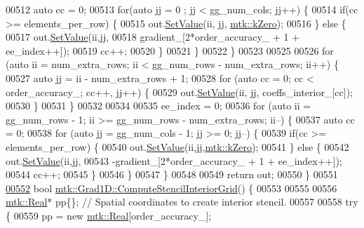 \begin{DoxyCode}
{{00512     \textcolor{keyword}{auto} cc = 0;
00513     \textcolor{keywordflow}{for}(\textcolor{keyword}{auto} jj = 0 ; jj < gg\_num\_cols; jj++) \{
00514       \textcolor{keywordflow}{if}(cc >= elements\_per\_row) \{
00515         out.\hyperlink{classmtk_1_1DenseMatrix_ae0f873a6d3a734da467cafb817da64ae}{SetValue}(ii, jj, \hyperlink{group__c01-roots_ga59a451a5fae30d59649bcda274fea271}{mtk::kZero});
00516       \} \textcolor{keywordflow}{else} \{
00517         out.\hyperlink{classmtk_1_1DenseMatrix_ae0f873a6d3a734da467cafb817da64ae}{SetValue}(ii,jj,
00518                      gradient\_[2*order\_accuracy\_ + 1 + ee\_index++]);
00519         cc++;
00520       \}
00521     \}
00522   \}
00523 
00525 
00526   \textcolor{keywordflow}{for} (\textcolor{keyword}{auto} ii = num\_extra\_rows; ii < gg\_num\_rows - num\_extra\_rows; ii++) \{
00527     \textcolor{keyword}{auto} jj = ii - num\_extra\_rows + 1;
00528     \textcolor{keywordflow}{for} (\textcolor{keyword}{auto} cc = 0; cc < order\_accuracy\_; cc++, jj++) \{
00529       out.\hyperlink{classmtk_1_1DenseMatrix_ae0f873a6d3a734da467cafb817da64ae}{SetValue}(ii, jj, coeffs\_interior\_[cc]);
00530     \}
00531   \}
00532 
00534 
00535   ee\_index = 0;
00536   \textcolor{keywordflow}{for} (\textcolor{keyword}{auto} ii = gg\_num\_rows - 1; ii >= gg\_num\_rows - num\_extra\_rows; ii--) \{
00537     \textcolor{keyword}{auto} cc = 0;
00538     \textcolor{keywordflow}{for} (\textcolor{keyword}{auto} jj = gg\_num\_cols - 1; jj >= 0; jj--) \{
00539       \textcolor{keywordflow}{if}(cc >= elements\_per\_row) \{
00540         out.\hyperlink{classmtk_1_1DenseMatrix_ae0f873a6d3a734da467cafb817da64ae}{SetValue}(ii,jj,\hyperlink{group__c01-roots_ga59a451a5fae30d59649bcda274fea271}{mtk::kZero});
00541       \} \textcolor{keywordflow}{else} \{
00542         out.\hyperlink{classmtk_1_1DenseMatrix_ae0f873a6d3a734da467cafb817da64ae}{SetValue}(ii,jj,
00543                      -gradient\_[2*order\_accuracy\_ + 1 + ee\_index++]);
00544         cc++;
00545       \}
00546      \}
00547   \}
00548 
00549   \textcolor{keywordflow}{return} out;
00550 \}
00551 
\hypertarget{mtk__grad__1d_8cc_source_l00552}{}\hyperlink{classmtk_1_1Grad1D_ad6df25cc9dfc85ff8562ae3605486976}{00552} \textcolor{keywordtype}{bool} \hyperlink{classmtk_1_1Grad1D_ad6df25cc9dfc85ff8562ae3605486976}{mtk::Grad1D::ComputeStencilInteriorGrid}() \{
00553 
00555 
00556   \hyperlink{group__c01-roots_gac080bbbf5cbb5502c9f00405f894857d}{mtk::Real}* pp\{\}; \textcolor{comment}{// Spatial coordinates to create interior stencil.}
00557 
00558   \textcolor{keywordflow}{try} \{
00559     pp = \textcolor{keyword}{new} \hyperlink{group__c01-roots_gac080bbbf5cbb5502c9f00405f894857d}{mtk::Real}[order\_accuracy\_];
}}
\end{DoxyCode}
